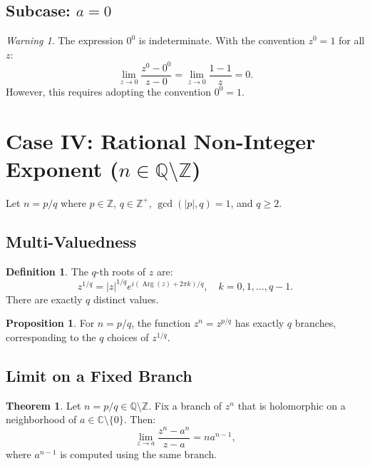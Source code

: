 \documentclass{article}
\theoremstyle{definition}
\newtheorem{definition}{Definition}[section]
\newtheorem{theorem}{Theorem}[section]
\newtheorem{proposition}{Proposition}[section]
\theoremstyle{remark}
\newtheorem{warning}{Warning}[section]
\newcommand{\C}{\mathbb{C}}
\newcommand{\Z}{\mathbb{Z}}
\newcommand{\Q}{\mathbb{Q}}
\newcommand{\Arg}{\operatorname{Arg}}
\begin{document}
\subsection{Subcase: $a = 0$}

\begin{warning}
The expression $0^0$ is indeterminate. With the convention $z^0 = 1$ for all $z$:
\begin{equation}
\lim_{z \to 0} \frac{z^0 - 0^0}{z - 0} = \lim_{z \to 0} \frac{1 - 1}{z} = 0.
\end{equation}
However, this requires adopting the convention $0^0 = 1$.
\end{warning}

\section{Case IV: Rational Non-Integer Exponent ($n \in \Q \setminus \Z$)}

Let $n = p/q$ where $p \in \Z$, $q \in \Z^+$, $\gcd(|p|, q) = 1$, and $q \geq 2$.

\subsection{Multi-Valuedness}

\begin{definition}
The $q$-th roots of $z$ are:
\begin{equation}
z^{1/q} = |z|^{1/q} e^{i(\Arg(z) + 2\pi k)/q}, \quad k = 0, 1, \ldots, q-1.
\end{equation}
There are exactly $q$ distinct values.
\end{definition}

\begin{proposition}
For $n = p/q$, the function $z^n = z^{p/q}$ has exactly $q$ branches, corresponding to the $q$ choices of $z^{1/q}$.
\end{proposition}

\subsection{Limit on a Fixed Branch}

\begin{theorem}
Let $n = p/q \in \Q \setminus \Z$. Fix a branch of $z^n$ that is holomorphic on a neighborhood of $a \in \C \setminus \{0\}$. Then:
\begin{equation}
\lim_{z \to a} \frac{z^n - a^n}{z - a} = n a^{n-1},
\end{equation}
where $a^{n-1}$ is computed using the same branch.
\end{theorem}
\end{document}
